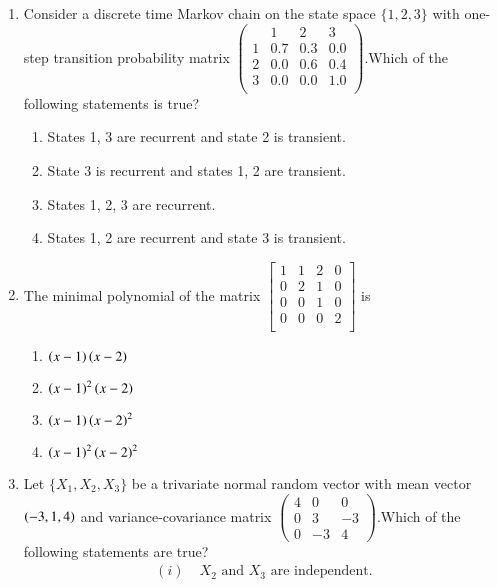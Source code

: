 \documentclass[journal]{IEEEtran}
\begin{document}
\begin{enumerate}
\begin{enumerate}
\end{enumerate}
\item Consider a discrete time Markov chain on the state space $\{1,2,3\}$ with one-step transition 
probability matrix 
$\begin{pmatrix}
   & 1 & 2 & 3 \\
1 & 0.7 & 0.3 & 0.0 \\
2 & 0.0 & 0.6 & 0.4 \\
3 & 0.0 & 0.0 & 1.0 \\ 
\end{pmatrix}$.Which of the following statements is true?
\begin{enumerate}
\item States 1, 3 are recurrent and state 2 is transient.
\item State 3 is recurrent and states 1, 2 are transient.
\item States 1, 2, 3 are recurrent.
\item States 1, 2 are recurrent and state 3 is transient.
\end{enumerate}
\item The minimal polynomial of the matrix $\begin{bmatrix}
1 & 1 & 2 & 0 \\
0 & 2 & 1 & 0 \\
0 & 0 & 1 & 0 \\
0 & 0 & 0 & 2 \\
\end{bmatrix}$ is
\begin{enumerate}
\item $\left(x-1\right)\left(x-2\right)$
\item $\left(x-1\right)^2\left(x-2\right)$
\item $\left(x-1\right)\left(x-2\right)^2$
\item $\left(x-1\right)^2\left(x-2\right)^2$
\end{enumerate}
\item Let $\{X_1, X_2, X_3\}$ be a trivariate normal random vector with mean vector $\left(-3,1,4\right)$ and variance-covariance matrix $\begin{pmatrix} 4 & 0 & 0 \\ 0 & 3 & -3 \\ 0 & -3 & 4 \end{pmatrix}$.Which of the following statements are true?
\begin{align*}
(i) & \; X_2 \text{ and } X_3 \text{ are independent.} \\ 

\end{align*}
\end{enumerate}
\end{document}
